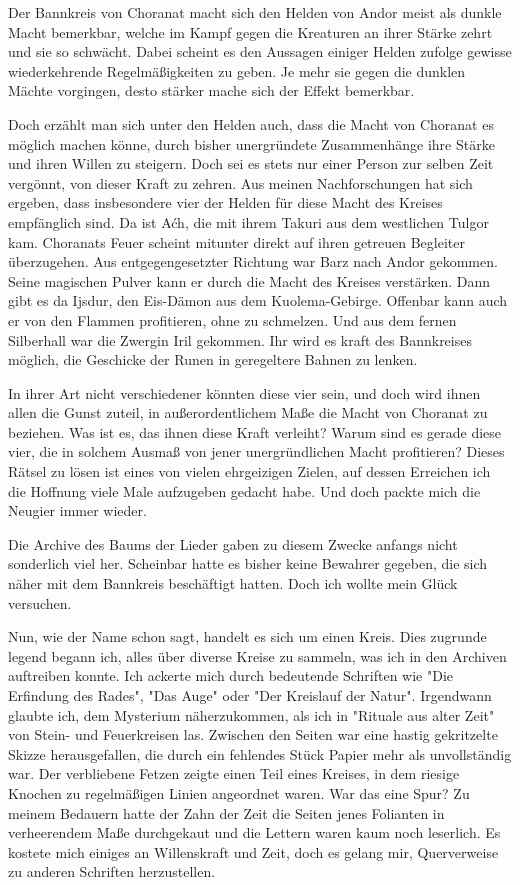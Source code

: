 \documentclass[10pt, a4paper, oneside]{book}
\begin{document}
\begin{multicols}{2}
Der Bannkreis von Choranat macht sich den Helden von Andor meist als dunkle Macht bemerkbar, welche im Kampf gegen die Kreaturen an ihrer Stärke zehrt und sie so schwächt. Dabei scheint es den Aussagen einiger Helden zufolge gewisse wiederkehrende Regelmäßigkeiten zu geben. Je mehr sie gegen die dunklen Mächte vorgingen, desto stärker mache sich der Effekt bemerkbar.\bigskip

Doch erzählt man sich unter den Helden auch, dass die Macht von Choranat es möglich machen könne, durch bisher unergründete Zusammenhänge ihre Stärke und ihren Willen zu steigern. Doch sei es stets nur einer Person zur selben Zeit vergönnt, von dieser Kraft zu zehren. Aus meinen Nachforschungen hat sich ergeben, dass insbesondere vier der Helden für diese Macht des Kreises empfänglich sind. Da ist Aćh, die mit ihrem Takuri aus dem westlichen Tulgor kam. Choranats Feuer scheint mitunter direkt auf ihren getreuen Begleiter überzugehen. Aus entgegengesetzter Richtung war Barz nach Andor gekommen. Seine magischen Pulver kann er durch die Macht des Kreises verstärken. Dann gibt es da Ijsdur, den Eis-Dämon aus dem Kuolema-Gebirge. Offenbar kann auch er von den Flammen profitieren, ohne zu schmelzen. Und aus dem fernen Silberhall war die Zwergin Iril gekommen. Ihr wird es kraft des Bannkreises möglich, die Geschicke der Runen in geregeltere Bahnen zu lenken.

In ihrer Art nicht verschiedener könnten diese vier sein, und doch wird ihnen allen die Gunst zuteil, in außerordentlichem Maße die Macht von Choranat zu beziehen. Was ist es, das ihnen diese Kraft verleiht? Warum sind es gerade diese vier, die in solchem Ausmaß von jener unergründlichen Macht profitieren? Dieses Rätsel zu lösen ist eines von vielen ehrgeizigen Zielen, auf dessen Erreichen ich die Hoffnung viele Male aufzugeben gedacht habe. Und doch packte mich die Neugier immer wieder.\bigskip

Die Archive des Baums der Lieder gaben zu diesem Zwecke anfangs nicht sonderlich viel her. Scheinbar hatte es bisher keine Bewahrer gegeben, die sich näher mit dem Bannkreis beschäftigt hatten. Doch ich wollte mein Glück versuchen.\bigskip

Nun, wie der Name schon sagt, handelt es sich um einen Kreis. Dies zugrunde legend begann ich, alles über diverse Kreise zu sammeln, was ich in den Archiven auftreiben konnte. Ich ackerte mich durch bedeutende Schriften wie "Die Erfindung des Rades", "Das Auge" oder "Der Kreislauf der Natur". Irgendwann glaubte ich, dem Mysterium näherzukommen, als ich in "Rituale aus alter Zeit" von Stein- und Feuerkreisen las. Zwischen den Seiten war eine hastig gekritzelte Skizze herausgefallen, die durch ein fehlendes Stück Papier mehr als unvollständig war. Der verbliebene Fetzen zeigte einen Teil eines Kreises, in dem riesige Knochen zu regelmäßigen Linien angeordnet waren. War das eine Spur? Zu meinem Bedauern hatte der Zahn der Zeit die Seiten jenes Folianten in verheerendem Maße durchgekaut und die Lettern waren kaum noch leserlich. Es kostete mich einiges an Willenskraft und Zeit, doch es gelang mir, Querverweise zu anderen Schriften herzustellen.\bigskip


\end{multicols}
\end{document}
